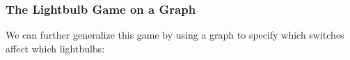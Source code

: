 \documentclass{beamer}
\newcommand{\off}{white}
\begin{document}
\begin{frame}
    \frametitle{The Lightbulb Game on a Graph}

    We can further generalize this game by using a graph to specify which switches
    affect which lightbulbs:

    \begin{figure}[!h]
        \centering
    \end{figure}
\end{frame}
\end{document}
